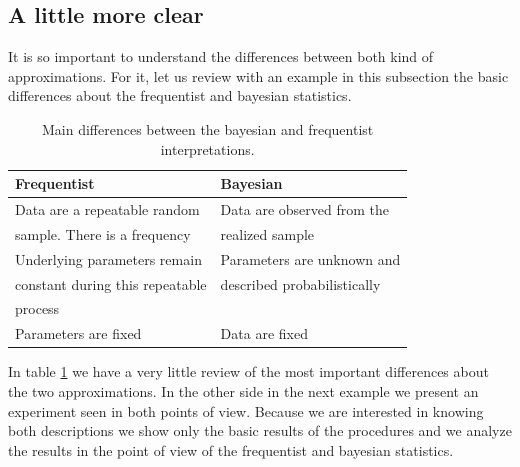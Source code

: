 \documentclass[onecolumn,           %
               showpacs,            %
               preprintnumbers,     %
               aps,                 %
               prl,          	    %
               letterpaper,             %
               superscriptaddress,      %
               nofootinbib,         %
               tightenlines,        %
               floats,floatfix      %
               ,usenatbib,
               ]{revtex4-1}
\begin{document}
\subsection{A little more clear}

It is so important to understand the differences between both kind of approximations. For it, let us review with an example in this subsection the basic differences about the frequentist and bayesian statistics.
\begin{table}[h!]
\centering
\begin{tabular}{||l|l||} 
 \hline
 \textbf{Frequentist} & \textbf{Bayesian} \\ [0.5ex] 
 \hline\hline
 Data are a repeatable random  & Data are observed from the   \\ 
 sample. There is a frequency & realized sample \\
 \hline 
 Underlying parameters remain & Parameters are unknown and \\
 constant during this repeatable & described probabilistically \\
 process &  \\
\hline
Parameters are fixed & Data are fixed\\ [1ex] 
 \hline
\end{tabular}
\caption{\footnotesize{Main differences between the bayesian and frequentist interpretations.}}
\label{table:1}
\end{table}

In table \ref{table:1} we have a very little review of the most important differences about the two approximations. In the other side in the next example we present an experiment seen in both points of view. Because we are interested in knowing both descriptions we show only the basic results of the procedures and we analyze the results in the point of view of the frequentist and bayesian statistics. 
\end{document}
